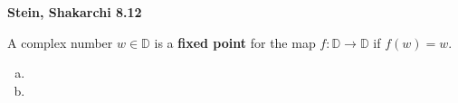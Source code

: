 \textbf{Stein, Shakarchi 8.12}

A complex number $w \in \mathbb{D}$ is a \textbf{fixed point} for the map $f : \mathbb{D} \to \mathbb{D}$ if $f(w) = w$.

\begin{enumerate}[a)]
  \item 
  \pagebreak
  \item 
\end{enumerate}
